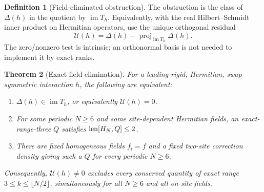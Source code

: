 \documentclass[11pt,a4paper]{article}
\numberwithin{equation}{section}
\newtheorem{theorem}{Theorem}[section]
\theoremstyle{definition}\newtheorem{definition}[theorem]{Definition}
\theoremstyle{remark}\newtheorem{remark}[theorem]{Remark}
\DeclareMathOperator{\im}{im}\DeclareMathOperator{\ad}{ad}
\begin{document}
\begin{definition}[Field-eliminated obstruction]
The obstruction is the class of $\Delta(h)$ in the quotient by $\im T_h$. Equivalently, with the real Hilbert--Schmidt inner product on Hermitian operators, use the unique orthogonal residual
\begin{equation}\label{eq:residual}
 \mathcal U(h)=\Delta(h)-\operatorname{proj}_{\im T_h}\Delta(h).
\end{equation}
The zero/nonzero test is intrinsic; an orthonormal basis is not needed to implement it by exact ranks.
\end{definition}

\begin{theorem}[Exact field elimination]\label{thm:quotient}
For a leading-rigid, Hermitian, swap-symmetric interaction $h$, the following are equivalent:
\begin{enumerate}[label=(\alph*),leftmargin=7mm,itemsep=2pt]
\item $\Delta(h)\in\im T_h$, or equivalently $\mathcal U(h)=0$.
\item For some periodic $N\ge6$ and some site-dependent Hermitian fields, an exact-range-three $Q$ satisfies $\operatorname{len}[H_N,Q]\le2$.
\item There are fixed homogeneous fields $f_i=f$ and a fixed two-site correction density giving such a $Q$ for every periodic $N\ge6$.
\end{enumerate}
Consequently, $\mathcal U(h)\ne0$ excludes every conserved quantity of exact range $3\le k\le\lfloor N/2\rfloor$, simultaneously for all $N\ge6$ and all on-site fields.
\end{theorem}
\end{document}

